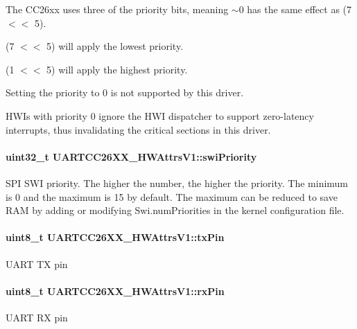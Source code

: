 The C\+C26xx uses three of the priority bits, meaning $\sim$0 has the same effect as (7 $<$$<$ 5).

(7 $<$$<$ 5) will apply the lowest priority.

(1 $<$$<$ 5) will apply the highest priority.

Setting the priority to 0 is not supported by this driver.

H\+W\+I\textquotesingle{}s with priority 0 ignore the H\+W\+I dispatcher to support zero-\/latency interrupts, thus invalidating the critical sections in this driver. 
\paragraph[{swi\+Priority}]{\setlength{\rightskip}{0pt plus 5cm}uint32\+\_\+t U\+A\+R\+T\+C\+C26\+X\+X\+\_\+\+H\+W\+Attrs\+V1\+::swi\+Priority}\label{struct_u_a_r_t_c_c26_x_x___h_w_attrs_v1_afc7bc36e36a8ba28553cc8c9c273c2a5}


S\+P\+I S\+W\+I priority. The higher the number, the higher the priority. The minimum is 0 and the maximum is 15 by default. The maximum can be reduced to save R\+A\+M by adding or modifying Swi.\+num\+Priorities in the kernel configuration file. 

\paragraph[{tx\+Pin}]{\setlength{\rightskip}{0pt plus 5cm}uint8\+\_\+t U\+A\+R\+T\+C\+C26\+X\+X\+\_\+\+H\+W\+Attrs\+V1\+::tx\+Pin}\label{struct_u_a_r_t_c_c26_x_x___h_w_attrs_v1_a54f587d72de124eee36082a0a196d5b1}
U\+A\+R\+T T\+X pin 
\paragraph[{rx\+Pin}]{\setlength{\rightskip}{0pt plus 5cm}uint8\+\_\+t U\+A\+R\+T\+C\+C26\+X\+X\+\_\+\+H\+W\+Attrs\+V1\+::rx\+Pin}\label{struct_u_a_r_t_c_c26_x_x___h_w_attrs_v1_af6cae05291cdffa89d831fab2d863262}
U\+A\+R\+T R\+X pin 
